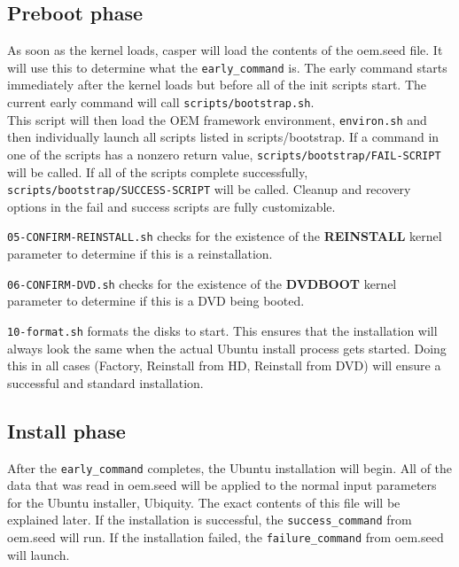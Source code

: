 \documentclass[letterpaper,10pt,titlepage]{article}
\begin{document}
\subsection{Preboot phase}
As soon as the kernel loads, casper will load the contents of the oem.seed file.  It will use this to determine what the \texttt{early_command} is.  The early command starts immediately after the kernel loads but before all of the init scripts start.  The current early command will call \texttt{scripts/bootstrap.sh}.
\\
This script will then load the OEM framework environment, \texttt{environ.sh} and then individually launch all scripts listed in scripts/bootstrap.  If a command in one of the scripts has a nonzero return value, \texttt{scripts/bootstrap/FAIL-SCRIPT} will be called.  If all of the scripts complete successfully, \texttt{scripts/bootstrap/SUCCESS-SCRIPT} will be called.  Cleanup and recovery options in the fail and success scripts are fully customizable.
\\
\begin{list}{}
\item \texttt{05-CONFIRM-REINSTALL.sh} checks for the existence of the \textbf{REINSTALL} kernel parameter to determine if this is a reinstallation.
\\
\item \texttt{06-CONFIRM-DVD.sh} checks for the existence of the \textbf{DVDBOOT} kernel parameter to determine if this is a DVD being booted.

\item \texttt{10-format.sh} formats the disks to start.  This ensures that the installation will always look the same when the actual Ubuntu install process gets started.  Doing this in all cases (Factory, Reinstall from HD, Reinstall from DVD) will ensure a successful and standard installation.
\end{list}

\subsection{Install phase}
After the \texttt{early_command} completes, the Ubuntu installation will begin.  All of the data that was read in oem.seed will be applied to the normal input parameters for the Ubuntu installer, Ubiquity.  The exact contents of this file will be explained later.
If the installation is successful, the \texttt{success_command} from oem.seed will run.  If the installation failed, the \texttt{failure_command} from oem.seed will launch.
\end{document}

